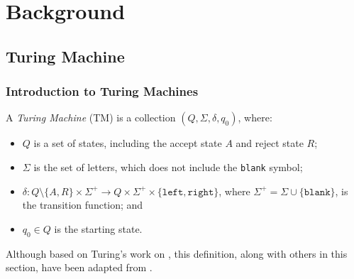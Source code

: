 \chapter{Background}
\section{Turing Machine}
\subsection{Introduction to Turing Machines}
A \emph{Turing Machine} (TM) is a collection $(Q, \Sigma, \delta, q_0)$, where:
\begin{itemize}
    \item $Q$ is a set of states, including the accept state $A$ and reject state $R$;
    \item $\Sigma$ is the set of letters, which does not include the \texttt{blank} symbol;
    \item $\delta \colon Q \setminus \{A, R\} \times \Sigma^+ \to Q \times \Sigma^+ \times \{\texttt{left}, \texttt{right}\}$, where $\Sigma^+ = \Sigma \cup \{\texttt{blank}\}$, is the transition function; and
    \item $q_0 \in Q$ is the starting state.
\end{itemize}
Although based on Turing's work on \cite{turing1936computable}, this definition, along with others in this section, have been adapted from \cite{hopcroft2001automata}.

